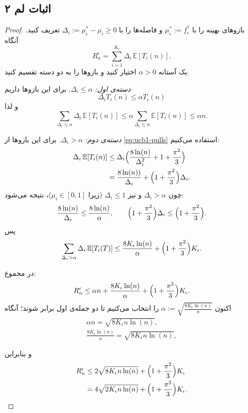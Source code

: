 \documentclass[a4paper,10pt,twocolumn]{article}
\begin{document}
\subsection*{اثبات لم ۲}
\begin{proof}
بازوهای بهینه را با $\mu^\ast_\epsilon:=f^\ast_\epsilon$ و فاصله‌ها را با
$\Delta_i:=\mu^\ast_\epsilon-\mu_i\ge0$ تعریف کنید. آنگاه
\[
R_n^\epsilon = \sum_{i=1}^{K_\epsilon} \Delta_i\,\mathbb{E}[T_i(n)].
\]
یک آستانه $\alpha>0$ اختیار کنید و بازوها را به دو دسته تقسیم کنید.

\medskip
\noindent
\emph{دسته‌ی اول:} $\Delta_i\le\alpha$. برای این بازوها داریم
\[\Delta_i T_i(n)\le \alpha T_i(n)\] و لذا
\[
\sum_{\Delta_i\le\alpha} \Delta_i\,\mathbb{E}[T_i(n)]
\le 
\alpha \sum_{\Delta_i\le\alpha}\mathbb{E}[T_i(n)]
\le \alpha n.
\]

\medskip
\noindent
\emph{دسته‌ی دوم:} $\Delta_i>\alpha$.
برای این بازوها از \eqref{eq:ucb1-pulls} استفاده می‌کنیم:
\begin{align*}
    \Delta_i\,\mathbb{E}[T_i(n)]
    &\le
    \Delta_i\Bigl(\frac{8\ln (n)}{\Delta_i^2} + 1 + \frac{\pi^2}{3}\Bigr)\\
    &=
    \frac{8\ln (n))}{\Delta_i} + \Bigl(1+\frac{\pi^2}{3}\Bigr)\Delta_i.
\end{align*}
چون $\Delta_i>\alpha$ و نیز $\Delta_i\le 1$ (زیرا $\mu_i\in[0,1]$)، نتیجه می‌شود:
\[
\frac{8\ln (n)}{\Delta_i}\le \frac{8\ln (n)}{\alpha},
\qquad
\Bigl(1+\frac{\pi^2}{3}\Bigr)\Delta_i \le \Bigl(1+\frac{\pi^2}{3}\Bigr).
\]
پس
\[
\sum_{\Delta_i>\alpha} \Delta_i\,\mathbb{E}[T_i(T)]
\le
\frac{8K_\epsilon \ln (n)}{\alpha}
+
\Bigl(1+\frac{\pi^2}{3}\Bigr)K_\epsilon.
\]

\medskip
در مجموع:
\[
R_n^\epsilon
\le
\alpha n + \frac{8K_\epsilon\ln (n)}{\alpha}
+
\Bigl(1+\frac{\pi^2}{3}\Bigr)K_\epsilon.
\]
اکنون $\alpha := \sqrt{\frac{8K_\epsilon\ln (n)}{n}}$ را انتخاب می‌کنیم تا دو جمله‌ی اول برابر شوند؛ آنگاه
\begin{align*}
    \alpha n = \sqrt{8K_\epsilon n\ln (n)},\\
    \frac{8K_\epsilon \ln (n)}{\alpha}=\sqrt{8K_\epsilon n\ln (n)},
\end{align*}

و بنابراین
\begin{align*}
    R_n^\epsilon
    &\le
    2\sqrt{8K_\epsilon n\ln (n)}
    +
    \Bigl(1+\frac{\pi^2}{3}\Bigr)K_\epsilon\\
    &=
    4\sqrt{2K_\epsilon n\ln (n)}
    +
    \Bigl(1+\frac{\pi^2}{3}\Bigr)K_\epsilon.
\end{align*}
\end{proof}



\begin{LTR}


\end{LTR}
\end{document}
